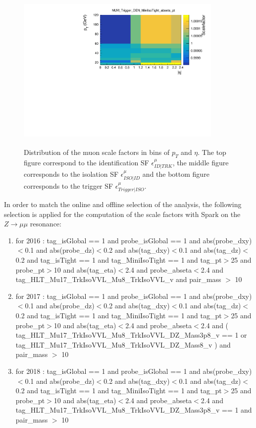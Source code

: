 \documentclass{cernatlasnote}
\begin{document}
\begin{figure}
    \includegraphics[height=8cm, width=10cm, trim= 0cm 0cm 0cm 0.cm,clip]{images/Muon/NUM_Trigger_DEN_MiniIsoTight.pdf}
    \caption{ Distribution of the muon scale factors in bins of $p_T$ and $\eta$. The top figure correspond to the identification SF $\epsilon^{\mu}_{ID|TRK}$, the middle figure corresponds to the isolation SF $\epsilon^{\mu}_{ISO|ID}$ and the bottom figure corresponds to the trigger SF $\epsilon^{\mu}_{Trigger|ISO}$.}
    \label{fig:SP1}
\end{figure}

In order to match the online and offline selection of the analysis, the following selection is applied for the computation of the scale factors with Spark on the $Z\rightarrow\mu\mu$ resonance:\\
\begin{enumerate}
    \item for 2016 : tag\_isGlobal == 1 and probe\_isGlobal == 1 and abs(probe\_dxy)$<$0.1 and abs(probe\_dz)$<$0.2 and abs(tag\_dxy)$<$0.1 and abs(tag\_dz)$<$0.2 and tag\_isTight == 1 and tag\_MiniIsoTight == 1 and tag\_pt$>$25 and probe\_pt$>$10  and abs(tag\_eta)$<$2.4 and probe\_abseta$<$2.4 and tag\_HLT\_Mu17\_TrkIsoVVL\_Mu8\_TrkIsoVVL\_v and pair\_mass $>$ 10
        
    \item for 2017 : tag\_isGlobal == 1 and probe\_isGlobal == 1 and abs(probe\_dxy)$<$0.1 and abs(probe\_dz)$<$0.2 and abs(tag\_dxy)$<$0.1 and abs(tag\_dz)$<$0.2 and tag\_isTight == 1 and tag\_MiniIsoTight == 1 and tag\_pt$>$25 and probe\_pt$>$10  and abs(tag\_eta)$<$2.4 and probe\_abseta$<$2.4 and ( tag\_HLT\_Mu17\_TrkIsoVVL\_Mu8\_TrkIsoVVL\_DZ\_Mass3p8\_v == 1 or \\ tag\_HLT\_Mu17\_TrkIsoVVL\_Mu8\_TrkIsoVVL\_DZ\_Mass8\_v ) and pair\_mass $>$ 10
        
    \item for 2018 :  tag\_isGlobal == 1 and probe\_isGlobal == 1 and abs(probe\_dxy)$<$0.1 and abs(probe\_dz)$<$0.2 and abs(tag\_dxy)$<$0.1 and abs(tag\_dz)$<$0.2 and tag\_isTight == 1 and tag\_MiniIsoTight == 1 and tag\_pt$>$25 and probe\_pt$>$10  and abs(tag\_eta)$<$2.4 and probe\_abseta$<$2.4 and tag\_HLT\_Mu17\_TrkIsoVVL\_Mu8\_TrkIsoVVL\_DZ\_Mass3p8\_v == 1  and pair\_mass $>$ 10
\end{enumerate}
\end{document}
